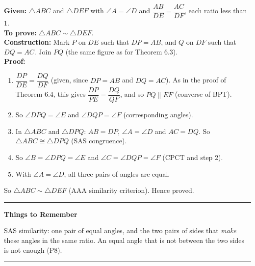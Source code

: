 \documentclass[11pt,a4paper]{article}
\theoremstyle{branddef}
\newcommand{\tr}{\triangle}
\newenvironment{steps}{\begin{enumerate}[label=\arabic*.,leftmargin=1.5em,itemsep=0pt,topsep=2pt]}{\end{enumerate}}
\newcommand{\rememberbox}[1]{%
  \par\medskip\noindent\textcolor{black!35}{\rule{\linewidth}{0.4pt}}\par\nointerlineskip\vspace{4pt}
  \noindent\textbf{Things to Remember}\par\smallskip #1\par\vspace{3pt}
  \noindent\textcolor{black!35}{\rule{\linewidth}{0.4pt}}\par\medskip}
\begin{document}
\textbf{Given:} $\tr ABC$ and $\tr DEF$ with $\angle A=\angle D$ and $\dfrac{AB}{DE}=\dfrac{AC}{DF}$, each ratio less than $1$.\\
\textbf{To prove:} $\tr ABC\sim\tr DEF$.\\
\textbf{Construction:} Mark $P$ on $DE$ such that $DP=AB$, and $Q$ on $DF$ such that $DQ=AC$. Join $PQ$ (the same figure as for Theorem 6.3).\\
\textbf{Proof:}
\begin{steps}
  \item $\dfrac{DP}{DE}=\dfrac{DQ}{DF}$ (given, since $DP=AB$ and $DQ=AC$). As in the proof of Theorem 6.4, this gives $\dfrac{DP}{PE}=\dfrac{DQ}{QF}$, and so $PQ\parallel EF$ (converse of BPT).
  \item So $\angle DPQ=\angle E$ and $\angle DQP=\angle F$ (corresponding angles).
  \item In $\tr ABC$ and $\tr DPQ$: $AB=DP$, $\angle A=\angle D$ and $AC=DQ$. So $\tr ABC\cong\tr DPQ$ (SAS congruence).
  \item So $\angle B=\angle DPQ=\angle E$ and $\angle C=\angle DQP=\angle F$ (CPCT and step 2).
  \item With $\angle A=\angle D$, all three pairs of angles are equal.
\end{steps}
So $\tr ABC\sim\tr DEF$ (AAA similarity criterion). \hfill Hence proved.

\rememberbox{SAS similarity: one pair of equal angles, and the two pairs of sides that \emph{make} these angles in the same ratio. An equal angle that is not between the two sides is not enough (P8).}
\end{document}

